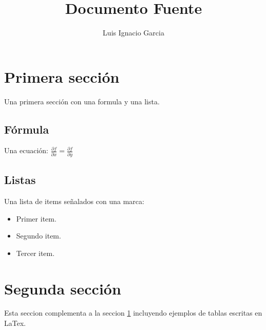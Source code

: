 \documentclass{article}
\begin{document}
\title{Documento Fuente \LaTex{}}
\author{Luis Ignacio Garcia}
\date{}



\tableofcontents
\newpage
\section{Primera secci\'on}\label{primera}
Una primera secci\'on con una formula y una lista.
\subsection{F\'ormula}
Una ecuaci\'on: \( \frac{\partial f}{\partial x}=
\frac{\partial f}{\partial y}\)
\subsection{Listas}
Una lista de items se\~nalados con una marca:
\begin{itemize}
\item Primer item.
\item Segundo item.
\item Tercer item.
\end{itemize}
\section{Segunda secci\'on}\label{segunda}
Esta seccion complementa a la seccion \ref{primera}
incluyendo ejemplos de tablas escritas en LaTex.
\end{document}
